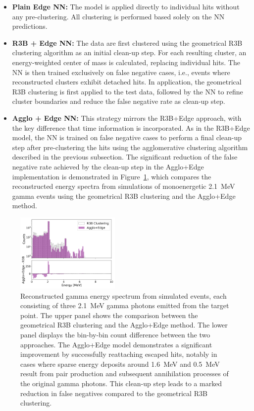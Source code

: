 \documentclass[final,5p,times,twocolumn]{elsarticle}
\begin{document}
\begin{itemize}
    \item \textbf{Plain Edge NN:} The model is applied directly to individual hits without any pre-clustering. All clustering is performed based solely on the NN predictions.
    \item \textbf{R3B + Edge NN:} The data are first clustered using the geometrical R3B clustering algorithm as an initial clean-up step. For each resulting cluster, an energy-weighted center of mass is calculated, replacing individual hits. The  NN is then trained exclusively on false negative cases, i.e., events where reconstructed clusters exhibit detached hits. In application, the geometrical R3B clustering is first applied to the test data, followed by the NN to refine cluster boundaries and reduce the false negative rate as clean-up step.
    \item \textbf{Agglo + Edge NN:} This strategy mirrors the R3B+Edge approach, with the key difference that time information is incorporated. As in the R3B+Edge model, the NN is trained on false negative cases to perform a final clean-up step after pre-clustering the hits using the agglomerative clustering algorithm described in the previous subsection. The significant reduction of the false negative rate achieved by the clean-up step in the Agglo+Edge implementation is demonstrated in Figure~\ref{fig:2_1_mev_r3b_aggloNN}, which compares the reconstructed energy spectra from simulations of monoenergetic 2.1~MeV gamma events using the geometrical R3B clustering and the Agglo+Edge method.
\end{itemize}
\begin{figure}[!htb]
        \centering
        \includegraphics[width=0.45\textwidth]{spec_2_1agglo_edge_vsr3b.png}
        \caption{Reconstructed gamma energy spectrum from simulated events, each consisting of three 2.1~MeV gamma photons emitted from the target point. The upper panel shows the comparison between the geometrical R3B clustering and the Agglo+Edge method. The lower panel displays the bin-by-bin count difference between the two approaches. The Agglo+Edge model demonstrates a significant improvement by successfully reattaching escaped hits, notably in cases where sparse energy deposits around 1.6~MeV and 0.5~MeV result from pair production and subsequent annihilation processes of the original gamma photons. This clean-up step leads to a marked reduction in false negatives compared to the geometrical R3B clustering.}
        \label{fig:2_1_mev_r3b_aggloNN}%
\end{figure}
\end{document}
